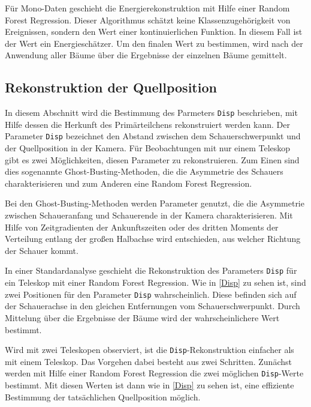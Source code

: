 Für Mono-Daten geschieht die Energierekonstruktion mit Hilfe einer Random Forest Regression.
Dieser Algorithmus schätzt keine Klassenzugehörigkeit von Ereignissen, sondern den Wert einer kontinuierlichen Funktion. 
In diesem Fall ist der Wert ein Energieschätzer.
Um den finalen Wert zu bestimmen, wird nach der Anwendung aller Bäume über die Ergebnisse der einzelnen Bäume gemittelt.\cite{EnergieRekonstruktion} 


\subsection{Rekonstruktion der Quellposition}
In diesem Abschnitt wird die Bestimmung des Parmeters \texttt{Disp} beschrieben, mit Hilfe dessen die Herkunft des Primärteilchens rekonstruiert werden kann. 
Der Parameter \texttt{Disp} bezeichnet den Abstand zwischen dem Schauerschwerpunkt und der Quellposition in der Kamera.
Für Beobachtungen mit nur einem Teleskop gibt es zwei Möglichkeiten, diesen Parameter zu rekonstruieren. 
Zum Einen sind dies sogenannte Ghost-Busting-Methoden, die die Asymmetrie des Schauers charakterisieren und zum Anderen eine Random Forest Regression.\cite{DispRekonstruktion}

Bei den Ghost-Busting-Methoden werden Parameter genutzt, die die Asymmetrie zwischen Schaueranfang und Schauerende in der Kamera charakterisieren.
Mit Hilfe von Zeitgradienten der Ankunftszeiten oder des dritten Moments der Verteilung entlang der großen Halbachse wird entschieden, aus welcher Richtung der Schauer kommt.\cite{DispRekonstruktion}

In einer Standardanalyse geschieht die Rekonstruktion des Parameters \texttt{Disp} für ein Teleskop mit einer Random Forest Regression.
Wie in \autoref{Disp} zu sehen ist, sind zwei Positionen für den Parameter \texttt{Disp} wahrscheinlich.
Diese befinden sich auf der Schauerachse in den gleichen Entfernungen vom Schauerschwerpunkt.
Durch Mittelung über die Ergebnisse der Bäume wird der wahrscheinlichere Wert bestimmt.\cite{DispRekonstruktion}

Wird mit zwei Teleskopen observiert, ist die \texttt{Disp}-Rekonstruktion einfacher als mit einem Teleskop.
Das Vorgehen dabei besteht aus zwei Schritten.
Zunächst werden mit Hilfe einer Random Forest Regression die zwei möglichen \texttt{Disp}-Werte bestimmt.
Mit diesen Werten ist dann wie in \autoref{Disp} zu sehen ist, eine effiziente Bestimmung der tatsächlichen Quellposition möglich.

